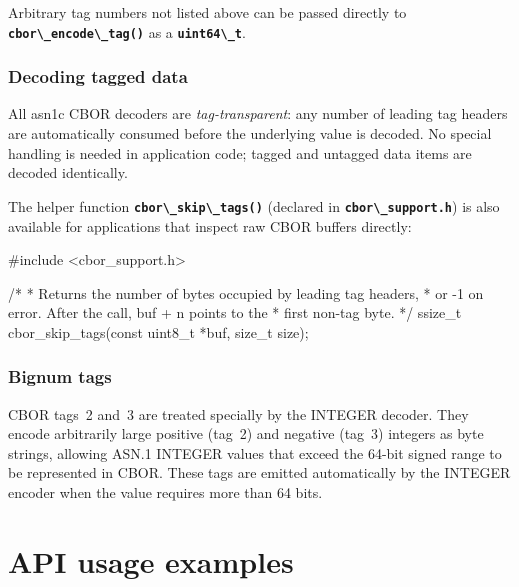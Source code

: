 \documentclass[english,oneside,12pt]{book}
\newcommand{\code}[1]{\texttt{\textbf{\lstinline{#1}}}}
\begin{document}
Arbitrary tag numbers not listed above can be passed directly to
\code{cbor\_encode\_tag()} as a \code{uint64\_t}.

\subsection*{Decoding tagged data}

All asn1c CBOR decoders are \emph{tag-transparent}: any number of leading
tag headers are automatically consumed before the underlying value is decoded.
No special handling is needed in application code; tagged and untagged data
items are decoded identically.

The helper function \code{cbor\_skip\_tags()} (declared in
\code{cbor\_support.h}) is also available for applications that inspect raw
CBOR buffers directly:

\begin{codesample}
#include <cbor_support.h>

/*
 * Returns the number of bytes occupied by leading tag headers,
 * or -1 on error.  After the call, buf + n points to the
 * first non-tag byte.
 */
ssize_t cbor_skip_tags(const uint8_t *buf, size_t size);
\end{codesample}

\subsection*{Bignum tags}

CBOR tags~2 and~3 are treated specially by the INTEGER decoder.
They encode arbitrarily large positive (tag~2) and negative (tag~3)
integers as byte strings, allowing ASN.1 INTEGER values that exceed the
64-bit signed range to be represented in CBOR.  These tags are emitted
automatically by the INTEGER encoder when the value requires more than
64 bits.

\chapter{API usage examples}
\end{document}
